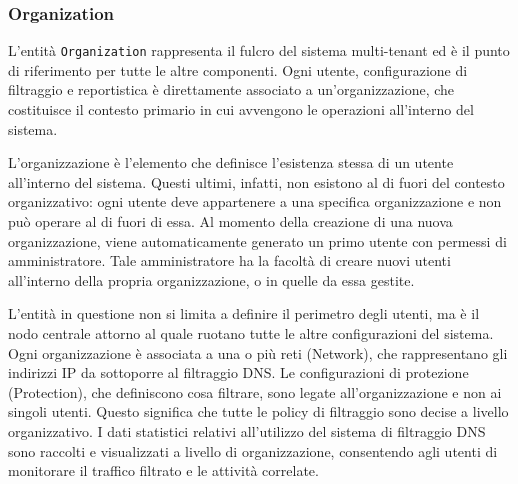 \subsubsection{Organization}
L'entità \texttt{Organization} rappresenta il fulcro del sistema multi-tenant ed è il punto di riferimento per tutte le altre componenti. Ogni utente, configurazione di filtraggio e reportistica è direttamente associato a un'organizzazione, che costituisce il contesto primario in cui avvengono le operazioni all'interno del sistema.

L'organizzazione è l'elemento che definisce l'esistenza stessa di un utente all'interno del sistema. Questi ultimi, infatti, non esistono al di fuori del contesto organizzativo: ogni utente deve appartenere a una specifica organizzazione e non può operare al di fuori di essa. Al momento della creazione di una nuova organizzazione, viene automaticamente generato un primo utente con permessi di amministratore. Tale amministratore ha la facoltà di creare nuovi utenti all'interno della propria organizzazione, o in quelle da essa gestite.

L'entità in questione non si limita a definire il perimetro degli utenti, ma è il nodo centrale attorno al quale ruotano tutte le altre configurazioni del sistema. Ogni organizzazione è associata a una o più reti (Network), che rappresentano gli indirizzi IP da sottoporre al filtraggio DNS. Le configurazioni di protezione (Protection), che definiscono cosa filtrare, sono legate all'organizzazione e non ai singoli utenti. Questo significa che tutte le policy di filtraggio sono decise a livello organizzativo. I dati statistici relativi all’utilizzo del sistema di filtraggio DNS sono raccolti e visualizzati a livello di organizzazione, consentendo agli utenti di monitorare il traffico filtrato e le attività correlate.

